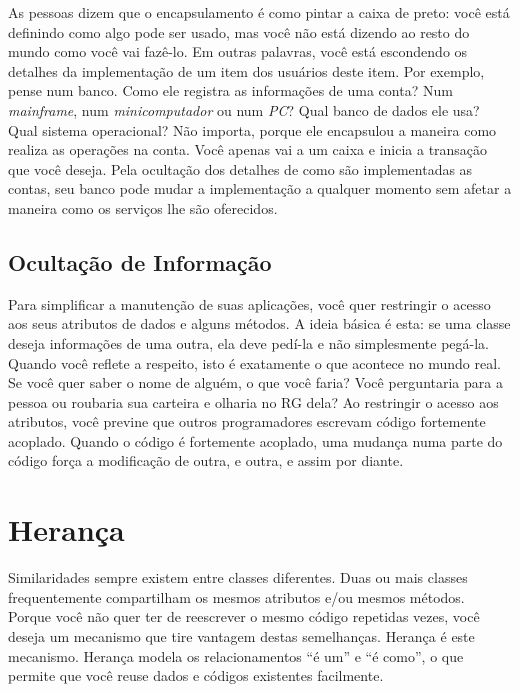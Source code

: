 \documentclass[
	article,			%
	12pt,				%
	openright,
	twoside,			%
	a4paper,			%
	english,			%
	french,
	brazil,				%
	sumario=tradicional
	]{abntex2}
\begin{document}
As pessoas dizem que o encapsulamento é como pintar a caixa de preto: você está definindo como algo pode ser usado, mas você não está dizendo ao resto do mundo como você vai fazê-lo. Em outras palavras, você está escondendo os detalhes da implementação de um item dos usuários deste item. Por exemplo, pense num banco. Como ele registra as informações de uma conta? Num \textit{mainframe}, num \textit{minicomputador} ou num \textit{PC}? Qual banco de dados ele usa? Qual sistema operacional? Não importa, porque ele encapsulou a maneira como realiza as operações na conta. Você apenas vai a um caixa e inicia a transação que você deseja. Pela ocultação dos detalhes de como são implementadas as contas, seu banco pode mudar a implementação a qualquer momento sem afetar a maneira como os serviços lhe são oferecidos.

\subsection{Ocultação de Informação}

Para simplificar a manutenção de suas aplicações, você quer restringir o acesso aos seus atributos de dados e alguns métodos. A ideia básica é esta: se uma classe deseja informações de uma outra, ela deve pedí-la e não simplesmente pegá-la. Quando você reflete a respeito, isto é exatamente o que acontece no mundo real. Se você quer saber o nome de alguém, o que você faria? Você perguntaria para a pessoa ou roubaria sua carteira e olharia no RG dela? Ao restringir o acesso aos atributos, você previne que outros programadores escrevam código fortemente acoplado. Quando o código é fortemente acoplado, uma mudança numa parte do código força a modificação de outra, e outra, e assim por diante.


\section{Herança}

Similaridades sempre existem entre classes diferentes. Duas ou mais classes frequentemente compartilham os mesmos atributos e/ou mesmos métodos. Porque você não quer ter de reescrever o mesmo código repetidas vezes, você deseja um mecanismo que tire vantagem destas semelhanças. Herança é este mecanismo. Herança modela os relacionamentos ``é um'' e ``é como'', o que permite que você reuse dados e códigos existentes facilmente.
\end{document}
